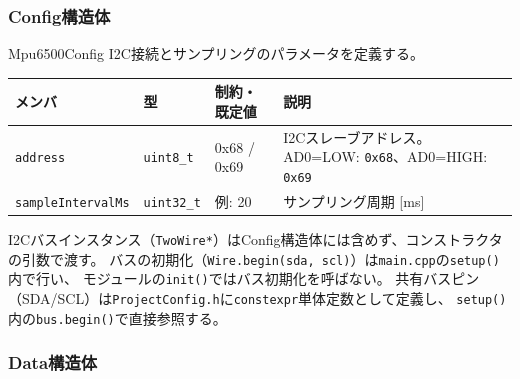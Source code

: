 \subsubsection{Config構造体}

\begin{funcblock}{Mpu6500Config}
I2C接続とサンプリングのパラメータを定義する。

\begin{longtable}{l l l p{4.5cm}}
\toprule
\textbf{メンバ} & \textbf{型} & \textbf{制約・既定値} & \textbf{説明} \\
\midrule
\endhead
\texttt{address}          & \texttt{uint8\_t}  & 0x68 / 0x69    & I2Cスレーブアドレス。AD0=LOW: \texttt{0x68}、AD0=HIGH: \texttt{0x69} \\
\texttt{sampleIntervalMs} & \texttt{uint32\_t} & 例: 20         & サンプリング周期 [ms] \\
\bottomrule
\end{longtable}
\end{funcblock}

\begin{notebox}[I2Cバス注入パターン]
I2Cバスインスタンス（\texttt{TwoWire*}）はConfig構造体には含めず、コンストラクタの引数で渡す。
バスの初期化（\texttt{Wire.begin(sda, scl)}）は\texttt{main.cpp}の\texttt{setup()}内で行い、
モジュールの\texttt{init()}ではバス初期化を呼ばない。
共有バスピン（SDA/SCL）は\texttt{ProjectConfig.h}に\texttt{constexpr}単体定数として定義し、
\texttt{setup()}内の\texttt{bus.begin()}で直接参照する。
\end{notebox}

\subsubsection{Data構造体}

